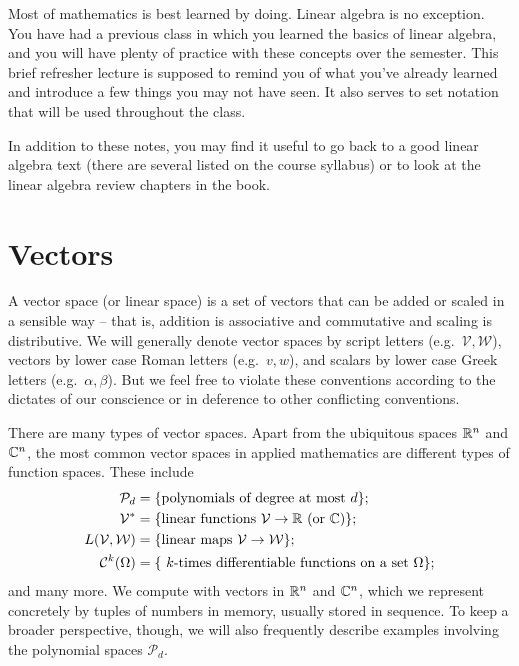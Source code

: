 \documentclass[12pt, leqno]{article}
\begin{document}

Most of mathematics is best learned by doing.  Linear algebra is no
exception.  You have had a previous class in which you learned the
basics of linear algebra, and you will have plenty of practice with
these concepts over the semester.  This brief refresher lecture is
supposed to remind you of what you've already learned and introduce a
few things you may not have seen.  It also serves to set notation
that will be used throughout the class.

In addition to these notes, you may find it useful to go back to a
good linear algebra text (there are several listed on the course
syllabus) or to look at the linear algebra review chapters in the
book.

\section{Vectors}

A vector space (or linear space) is a set of vectors that can be added
or scaled in a sensible way -- that is, addition is associative and
commutative and scaling is distributive.  We will generally denote
vector spaces by script letters (e.g.~$\mathcal{V}, \mathcal{W}$),
vectors by lower case Roman letters (e.g.~$v, w$), and scalars by
lower case Greek letters (e.g.~$\alpha, \beta$).  But we feel free to
violate these conventions according to the dictates of our conscience
or in deference to other conflicting conventions.

There are many types of vector spaces.  Apart from the ubiquitous
spaces $\mathbb{R}^n$ and $\mathbb{C}^n$, the most common vector spaces in applied
mathematics are different types of function spaces.  These include
\begin{align*}
  \mathcal{P}_d &=
  \{ \mbox{polynomials of degree at most $d$} \}; \\
  \mathcal{V}^* &=
  \{ \mbox{linear functions $\mathcal{V} \rightarrow \mathbb{R}$ (or $\mathbb{C}$)} \}; \\
  L(\mathcal{V}, \mathcal{W}) &=
  \{ \mbox{linear maps $\mathcal{V} \rightarrow \mathcal{W}$} \}; \\
  \mathcal{C}^k(\Omega) &=
  \{\mbox{ $k$-times differentiable functions on a set $\Omega$} \};
\end{align*}
and many more.  We compute with vectors in $\mathbb{R}^n$ and $\mathbb{C}^n$,
which we represent concretely by tuples of numbers in memory, usually
stored in sequence.  To keep a broader perspective, though, we will
also frequently describe examples involving the polynomial spaces
$\mathcal{P}_d$.
\end{document}
